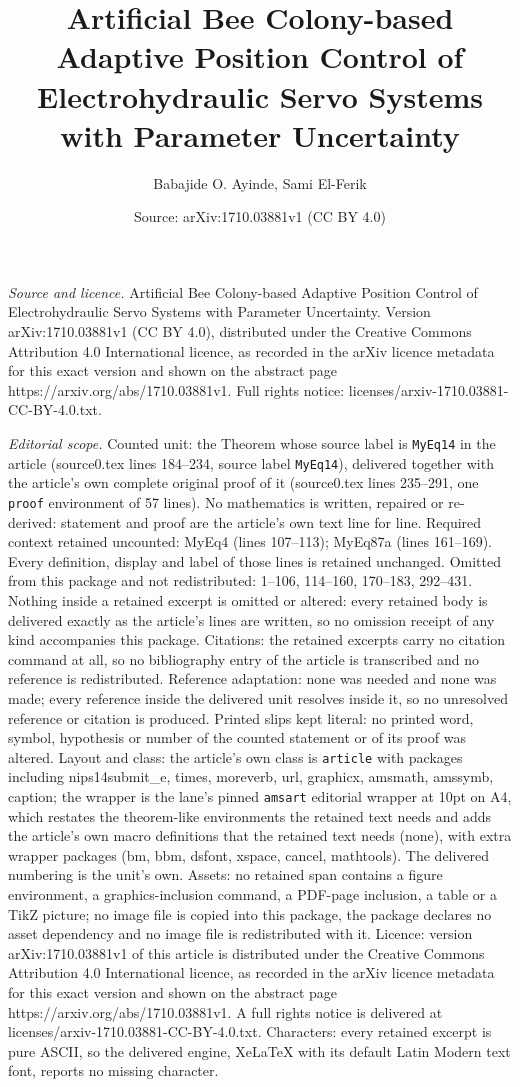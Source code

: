 \documentclass[10pt,a4paper]{amsart}
\title[Artificial Bee Colony-based Adaptive Position Control of Ele]{Artificial Bee Colony-based Adaptive Position Control of Electrohydraulic Servo Systems with Parameter Uncertainty}
\author{Babajide O. Ayinde, Sami El-Ferik}
\date{Source: arXiv:1710.03881v1 (CC BY 4.0)}
\begin{document}
\maketitle

\noindent\emph{Source and licence.} Artificial Bee Colony-based Adaptive Position Control of Electrohydraulic Servo Systems with Parameter Uncertainty. Version arXiv:1710.03881v1 (CC BY 4.0), distributed under the Creative Commons Attribution 4.0 International licence, as recorded in the arXiv licence metadata for this exact version and shown on the abstract page https://arxiv.org/abs/1710.03881v1. Full rights notice: licenses/arxiv-1710.03881-CC-BY-4.0.txt.\par\smallskip

\noindent\textit{Editorial scope.} Counted unit: the Theorem whose source label is \texttt{MyEq14} in the article (source0.tex lines 184--234, source label \texttt{MyEq14}), delivered together with the article's own complete original proof of it (source0.tex lines 235--291, one \texttt{proof} environment of 57 lines). No mathematics is written, repaired or re-derived: statement and proof are the article's own text line for line. Required context retained uncounted: MyEq4 (lines 107--113); MyEq87a (lines 161--169). Every definition, display and label of those lines is retained unchanged. Omitted from this package and not redistributed: 1--106, 114--160, 170--183, 292--431. Nothing inside a retained excerpt is omitted or altered: every retained body is delivered exactly as the article's lines are written, so no omission receipt of any kind accompanies this package. Citations: the retained excerpts carry no citation command at all, so no bibliography entry of the article is transcribed and no reference is redistributed. Reference adaptation: none was needed and none was made; every reference inside the delivered unit resolves inside it, so no unresolved reference or citation is produced. Printed slips kept literal: no printed word, symbol, hypothesis or number of the counted statement or of its proof was altered. Layout and class: the article's own class is \texttt{article} with packages including nips14submit\_e, times, moreverb, url, graphicx, amsmath, amssymb, caption; the wrapper is the lane's pinned \texttt{amsart} editorial wrapper at 10pt on A4, which restates the theorem-like environments the retained text needs and adds the article's own macro definitions that the retained text needs (none), with extra wrapper packages (bm, bbm, dsfont, xspace, cancel, mathtools). The delivered numbering is the unit's own. Assets: no retained span contains a figure environment, a graphics-inclusion command, a PDF-page inclusion, a table or a TikZ picture; no image file is copied into this package, the package declares no asset dependency and no image file is redistributed with it. Licence: version arXiv:1710.03881v1 of this article is distributed under the Creative Commons Attribution 4.0 International licence, as recorded in the arXiv licence metadata for this exact version and shown on the abstract page https://arxiv.org/abs/1710.03881v1. A full rights notice is delivered at licenses/arxiv-1710.03881-CC-BY-4.0.txt. Characters: every retained excerpt is pure ASCII, so the delivered engine, XeLaTeX with its default Latin Modern text font, reports no missing character.
\end{document}
